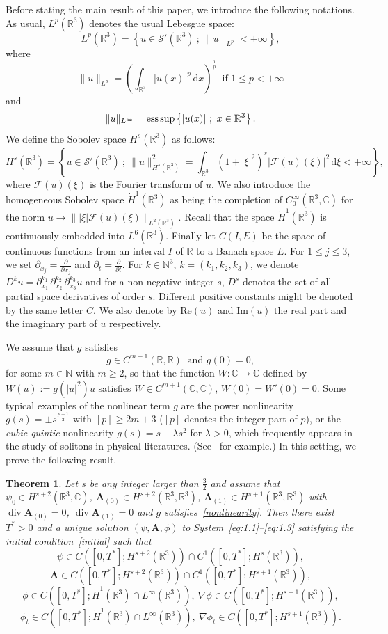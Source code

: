 \documentclass[10pt]{amsart}
\newtheorem{theo}{Theorem}[section]
\theoremstyle{definition}\newtheorem{defi}[theo]{Definition}\newtheorem{rema}[theo]{Remark}\newtheorem{exam}[theo]{Example}\newtheorem{exem}[theo]{Example}\newtheorem{nota}[theo]{Notation}
\newcommand{\BA}{\mathbf{A}}
\newcommand{\R}{\mathbb{R}}
\newcommand{\Com}{\mathbb{C}}
\newcommand{\N}{\mathbb{N}}
\DeclareMathOperator{\Div}{div}
\newcommand*{\dd}{\mathrm{d}}
\newcommand*{\dx}{\dd x}
\newcommand*{\dxi}{\dd\xi}
\begin{document}
Before stating the main result of this paper, we introduce the following notations. As usual, $L^p(\R^3)$ denotes the usual Lebesgue space:
\[
L^p(\R^3)=\left\{ u \in \mathcal{S}'(\R^3) \ ; \ \| u \| _{L^p} <+\infty \right\},
\]
where
\[
\| u \|_{L^p}=\left(\int_{\R^3} |u(x)|^p \,\dx \right)^{\frac{1}{p}} \
\text{ if } 1\leq p<+\infty
\]
and
\[
\| u \|_{L^{\infty}} =\text{ess\,sup}\left\{ |u(x)| \ ; \ x\in\R^3 \right\}.
\]
We define the Sobolev space $H^s(\R^3)$ as follows:
\[
H^s(\R^3)=\left \{u \in \mathcal{S}'(\R^3) \ ; \ \| u \|_{H^s(\R^3)}^2 = \int_{\R^3} (1+|\xi| ^2)^s |\mathcal{F}(u)(\xi)|^ 2 \,\dxi < +\infty \right \},
\]
where $\mathcal{F}(u)(\xi)$ is the Fourier transform of $u$. We also introduce the homogeneous Sobolev space $\dot{H}^1(\R^3)$ as being the completion of $C^{\infty}_0(\R^3,\Com)$ for the norm $u \to \| |\xi| \mathcal{F}(u)(\xi) \|_{L^2(\R^3)}$. Recall that the space $\dot{H}^1(\R^3)$ is continuously embedded into $L^6(\R^3)$. Finally let $C(I,E)$ be the space of continuous functions from an interval $I$ of $\R$ to a Banach space $E$. For $1\leq j \leq 3$, we set $\partial_{x_j}=\frac{\partial}{\partial x_j}$ and $\partial_{t}=\frac{\partial}{\partial t}$. For $k\in \N^3$, $k=(k_1,k_2,k_3)$, we denote $D^k u=\partial_{x_1}^{k_1} \, \partial_{x_2}^{k_2} \, \partial_{x_3}^{k_3} u$ and for a non-negative integer $s$, $D^s$ denotes the set of all partial space derivatives of order $s$. Different positive constants might be denoted by the same letter $C$. We also denote by $\text{Re}(u)$ and $\text{Im}(u)$ the real part and the imaginary part of $u$ respectively.

We assume that $g$ satisfies
\begin{equation}\label{nonlinearity}
g \in C^{m+1}(\R,\R) \ \text{ and } g(0)=0,
\end{equation}
for some $m \in \N$ with $m \ge 2$, so that the function $W:\Com \to \Com$ defined by $W(u):=g(|u|^2)u$ satisfies $W\in C^{m+1}(\Com,\Com)$, $W(0)=W'(0)=0$. Some typical examples of the nonlinear term $g$ are the power nonlinearity $g(s)=\pm s^{\frac{p-1}{2}}$ with $[p]\ge 2m+3$ ($[p]$ denotes the integer part of $p$), or the \emph{cubic-quintic} nonlinearity $g(s)= s-\lambda s^2$ for $\lambda>0$, which frequently appears in the study of solitons in physical literatures. (See~\cite{RV} for example.) In this setting, we prove the following result.


\begin{theo}\label{th1}
Let $s$ be any integer larger than $\frac{3}{2}$ and assume that $\psi_0\in H^{s+2}(\R^3,\Com)$, $\BA_{(0)}\in H^{s+2}(\R^3,\R^3)$, $\BA_{(1)} \in H^{s+1}(\R^3,\R^3)$ with $\Div \BA_{(0)}=0$, $\Div \BA_{(1)}=0$ and $g$ satisfies~\eqref{nonlinearity}. Then there exist $T^*>0$ and a unique solution $(\psi,\BA,\phi)$ to System~\eqref{eq:1.1}--\eqref{eq:1.3} satisfying the initial condition~\eqref{initial} such that
\[
\psi \in C([0,T^*];H^{s+2}(\R^3)) \cap C^1([0,T^*]; H^s(\R^3)),
\]
\[
\BA \in C([0,T^*];H^{s+2}(\R^3)) \cap C^1([0,T^*];H^{s+1}(\R^3)),
\]
\[
\phi \in C([0,T^*];\dot{H}^1(\R^3)\cap L^{\infty}(\R^3)), \
\nabla \phi \in C([0,T^*];H^{s+1}(\R^3)),
\]
\[
\phi_t \in C([0,T^*];\dot{H}^1(\R^3) \cap L^{\infty}(\R^3)), \
\nabla \phi_t \in C([0,T^*];H^{s+1}(\R^3)).
\]
\end{theo}
\end{document}
